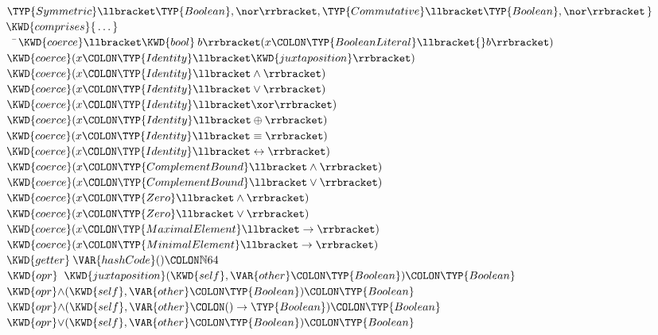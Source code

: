 \begin{Fortress}
\(              \TYP{Symmetric}\llbracket\TYP{Boolean},\nor\rrbracket, \TYP{Commutative}\llbracket\TYP{Boolean},\nor\rrbracket\,\}\)\-\\\poptabs
\(    \KWD{comprises} \{\,\ldots\,\}\)\-\\\poptabs
{\tt~~}\pushtabs\=\+\(  \KWD{coerce}\llbracket\KWD{bool}\:b\rrbracket(x\COLON \TYP{BooleanLiteral}\llbracket{}b\rrbracket)\)\\
\(  \KWD{coerce}(x\COLON \TYP{Identity}\llbracket\KWD{juxtaposition}\rrbracket)\)\\
\(  \KWD{coerce}(x\COLON \TYP{Identity}\llbracket\wedge\rrbracket)\)\\
\(  \KWD{coerce}(x\COLON \TYP{Identity}\llbracket\vee\rrbracket)\)\\
\(  \KWD{coerce}(x\COLON \TYP{Identity}\llbracket\xor\rrbracket)\)\\
\(  \KWD{coerce}(x\COLON \TYP{Identity}\llbracket\oplus\rrbracket)\)\\
\(  \KWD{coerce}(x\COLON \TYP{Identity}\llbracket\equiv\rrbracket)\)\\
\(  \KWD{coerce}(x\COLON \TYP{Identity}\llbracket\leftrightarrow\rrbracket)\)\\
\(  \KWD{coerce}(x\COLON \TYP{ComplementBound}\llbracket\wedge\rrbracket)\)\\
\(  \KWD{coerce}(x\COLON \TYP{ComplementBound}\llbracket\vee\rrbracket)\)\\
\(  \KWD{coerce}(x\COLON \TYP{Zero}\llbracket\wedge\rrbracket)\)\\
\(  \KWD{coerce}(x\COLON \TYP{Zero}\llbracket\vee\rrbracket)\)\\
\(  \KWD{coerce}(x\COLON \TYP{MaximalElement}\llbracket\rightarrow\rrbracket)\)\\
\(  \KWD{coerce}(x\COLON \TYP{MinimalElement}\llbracket\rightarrow\rrbracket)\)\\
\(  \KWD{getter}\:\VAR{hashCode}()\COLON \mathbb{N}64\)\\
\(  \KWD{opr}\;\;\KWD{juxtaposition}(\KWD{self}, \VAR{other}\COLON \TYP{Boolean})\COLON \TYP{Boolean}\)\\
\(  \KWD{opr} \mathord{\wedge}(\KWD{self}, \VAR{other}\COLON \TYP{Boolean})\COLON \TYP{Boolean}\)\\
\(  \KWD{opr} \mathord{\wedge}(\KWD{self}, \VAR{other}\COLON ()\rightarrow\TYP{Boolean})\COLON \TYP{Boolean}\)\\
\(  \KWD{opr} \mathord{\vee}(\KWD{self}, \VAR{other}\COLON \TYP{Boolean})\COLON \TYP{Boolean}\)\\

\end{Fortress}
